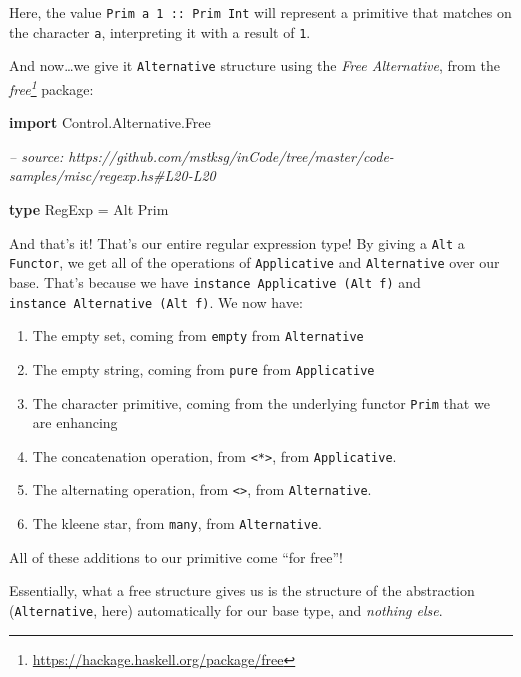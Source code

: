 \documentclass[]{article}
\newenvironment{Shaded}{}{}
\newcommand{\CommentTok}[1]{\textcolor[rgb]{0.38,0.63,0.69}{\textit{#1}}}
\newcommand{\DataTypeTok}[1]{\textcolor[rgb]{0.56,0.13,0.00}{#1}}
\newcommand{\FunctionTok}[1]{\textcolor[rgb]{0.02,0.16,0.49}{#1}}
\newcommand{\KeywordTok}[1]{\textcolor[rgb]{0.00,0.44,0.13}{\textbf{#1}}}
\renewcommand{\href}[2]{#2\footnote{\url{#1}}}
\begin{document}
Here, the value
\texttt{Prim\ \textquotesingle{}a\textquotesingle{}\ 1\ ::\ Prim\ Int} will
represent a primitive that matches on the character \texttt{a}, interpreting it
with a result of \texttt{1}.

And now\ldots{}we give it \texttt{Alternative} structure using the \emph{Free
Alternative}, from the
\emph{\href{https://hackage.haskell.org/package/free}{free}} package:

\begin{Shaded}
\begin{Highlighting}[]
\KeywordTok{import} \DataTypeTok{Control.Alternative.Free}

\CommentTok{-- source: https://github.com/mstksg/inCode/tree/master/code-samples/misc/regexp.hs#L20-L20}

\KeywordTok{type} \DataTypeTok{RegExp} \FunctionTok{=} \DataTypeTok{Alt} \DataTypeTok{Prim}
\end{Highlighting}
\end{Shaded}

And that's it! That's our entire regular expression type! By giving a
\texttt{Alt} a \texttt{Functor}, we get all of the operations of
\texttt{Applicative} and \texttt{Alternative} over our base. That's because we
have \texttt{instance\ Applicative\ (Alt\ f)} and
\texttt{instance\ Alternative\ (Alt\ f)}. We now have:

\begin{enumerate}
\def\labelenumi{\arabic{enumi}.}
\tightlist
\item
  The empty set, coming from \texttt{empty} from \texttt{Alternative}
\item
  The empty string, coming from \texttt{pure} from \texttt{Applicative}
\item
  The character primitive, coming from the underlying functor \texttt{Prim} that
  we are enhancing
\item
  The concatenation operation, from \texttt{\textless{}*\textgreater{}}, from
  \texttt{Applicative}.
\item
  The alternating operation, from \texttt{\textless{}\textbar{}\textgreater{}},
  from \texttt{Alternative}.
\item
  The kleene star, from \texttt{many}, from \texttt{Alternative}.
\end{enumerate}

All of these additions to our primitive come ``for free''!

Essentially, what a free structure gives us is the structure of the abstraction
(\texttt{Alternative}, here) automatically for our base type, and \emph{nothing
else}.
\end{document}
